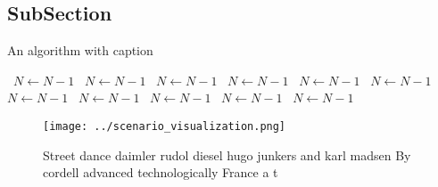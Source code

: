 \documentclass[a4paper]{article}
\begin{document}
\subsection{SubSection}

\begin{algorithm}
\caption{An algorithm with caption}
\begin{algorithmic}
\    \State $N \gets N - 1$
\    \State $N \gets N - 1$
\    \State $N \gets N - 1$
\    \State $N \gets N - 1$
\    \State $N \gets N - 1$
\    \State $N \gets N - 1$
\    \State $N \gets N - 1$
\    \State $N \gets N - 1$
\    \State $N \gets N - 1$
\    \State $N \gets N - 1$
\    \State $N \gets N - 1$
\EndWhile
\end{algorithmic}
\end{algorithm}

\begin{figure}
\centering
\texttt{[image: ../scenario\_visualization.png]}
\caption{Street dance daimler rudol diesel hugo junkers and karl madsen By cordell advanced technologically France a t
}
\end{figure}
 
\end{document}
